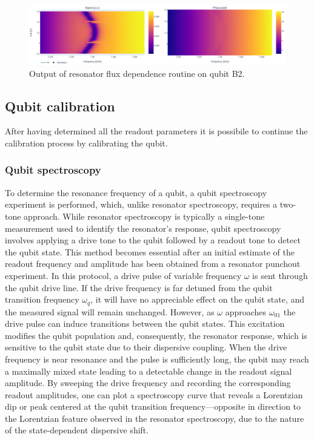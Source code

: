 \begin{figure}[h!]
    \centering
    \includegraphics[width=\textwidth]{figures/png/cute_flux.png}
    \caption{Output of resonator flux dependence routine on qubit B2.}
    \label{fig:res_flux_dep}
\end{figure}

\subsection{Qubit calibration}
After having determined all the readout parameters it is possibile to continue the calibration process by calibrating the qubit.

\subsubsection{Qubit spectroscopy}
To determine the resonance frequency of a qubit, a qubit spectroscopy experiment is performed, which, unlike resonator spectroscopy, requires a two-tone approach. 
While resonator spectroscopy is typically a single-tone measurement used to identify the resonator's response, qubit spectroscopy involves applying a drive tone to the qubit followed by a readout tone to detect the qubit state. 
This method becomes essential after an initial estimate of the readout frequency and amplitude has been obtained from a resonator punchout experiment. 
In this protocol, a drive pulse of variable frequency $\omega$ is sent through the qubit drive line. 
If the drive frequency is far detuned from the qubit transition frequency $\omega_{q}$, it will have no appreciable effect on the qubit state, and the measured signal will remain unchanged. 
However, as $\omega$ approaches $\omega_{01}$ the drive pulse can induce transitions between the qubit states. 
This excitation modifies the qubit population and, consequently, the resonator response, which is sensitive to the qubit state due to their dispersive coupling. 
When the drive frequency is near resonance and the pulse is sufficiently long, the qubit may reach a maximally mixed state leading to a detectable change in the readout signal amplitude. 
By sweeping the drive frequency and recording the corresponding readout amplitudes, one can plot a spectroscopy curve that reveals a Lorentzian dip or peak centered at the qubit transition frequency—opposite in direction to the Lorentzian feature observed in the resonator spectroscopy, due to the nature of the state-dependent dispersive shift.

